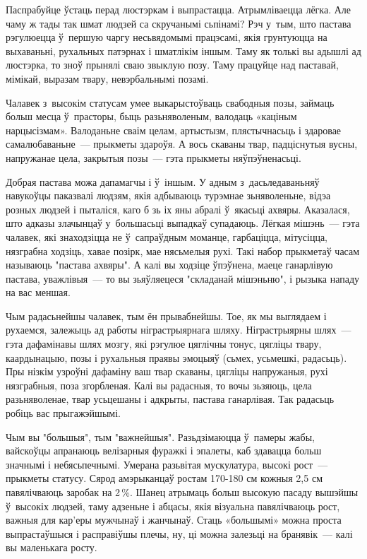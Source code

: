 Паспрабуйце ўстаць перад люстэркам і выпрастацца. Атрымліваецца лёгка. Але чаму ж тады так шмат людзей са скручанымі сьпінамі? Рэч у~тым, што пастава рэгулюецца ў~першую чаргу несьвядомымі працэсамі, якія грунтуюцца на выхаваньні, рухальных патэрнах і шматлікім іншым. Таму як толькі вы адышлі ад люстэрка, то зноў прынялі сваю звыклую позу. Таму працуйце над паставай, мімікай, выразам твару, невэрбальнымі позамі.

Чалавек з~высокім статусам умее выкарыстоўваць свабодныя позы, займаць больш месца ў~прасторы, быць разьняволеным, валодаць «каціным нарцысізмам». Валоданьне сваім целам, артыстызм, плястычнасьць і здаровае самалюбаваньне~--- прыкметы здароўя. А вось скаваны твар, падціснутыя вусны, напружанае цела, закрытыя позы~--- гэта прыкметы няўпэўненасьці.

Добрая пастава можа дапамагчы і ў~іншым. У адным з~дасьледаваньняў навукоўцы паказвалі людзям, якія адбываюць турэмнае зьняволеньне, відэа розных людзей і пыталіся, каго б зь іх яны абралі ў~якасьці ахвяры. Аказалася, што адказы злачынцаў у~большасьці выпадкаў супадаюць. Лёгкая мішэнь~--- гэта чалавек, які знаходзіцца не ў~сапраўдным моманце, гарбаціцца, мітусіцца, нязграбна ходзіць, хавае позірк, мае нясьмелыя рухі. Такі набор прыкметаў часам называюць "пастава ахвяры". А калі вы ходзіце ўпэўнена, маеце ганарлівую пастава, уважлівыя~--- то вы зьяўляецеся "складанай мішэньню", і рызыка нападу на вас меншая.

Чым радасьнейшы чалавек, тым ён прывабнейшы. Тое, як мы выглядаем і рухаемся, залежыць ад работы ніграстрыярнага шляху. Ніграстрыярны шлях~--- гэта дафамінавы шлях мозгу, які рэгулюе цяглічны тонус, цягліцы твару, каардынацыю, позы і рухальныя праявы эмоцыяў (сьмех, усьмешкі, радасьць). Пры нізкім узроўні дафаміну ваш твар скаваны, цягліцы напружаныя, рухі нязграбныя, поза згорбленая. Калі вы радасныя, то вочы зьзяюць, цела разьняволенае, твар усьцешаны і адкрыты, пастава ганарлівая. Так радасьць робіць вас прыгажэйшымі.

Чым вы "большыя", тым "важнейшыя". Разьдзімаюцца ў~памеры жабы, вайскоўцы апранаюць велізарныя фуражкі і эпалеты, каб здавацца больш значнымі і небясьпечнымі. Умерана разьвітая мускулатура, высокі рост~--- прыкметы статусу. Сярод амэрыканцаў ростам 170-180 см кожныя 2,5 см павялічваюць заробак на 2\,\%. Шанец атрымаць больш высокую пасаду вышэйшы ў~высокіх людзей, таму адзеньне і абцасы, якія візуальна павялічваюць рост, важныя для кар'еры мужчынаў і жанчынаў. Стаць «большымі» можна проста выпрастаўшыся і расправіўшы плечы, ну, ці можна залезьці на бранявік~--- калі вы маленькага росту. 

